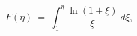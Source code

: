 \begin{equation}
   \label{Spence}
   F(\eta) \ =\ \int_1^\eta \frac {\ln(1+\xi)}\xi \ d\xi,
    \end{equation}

